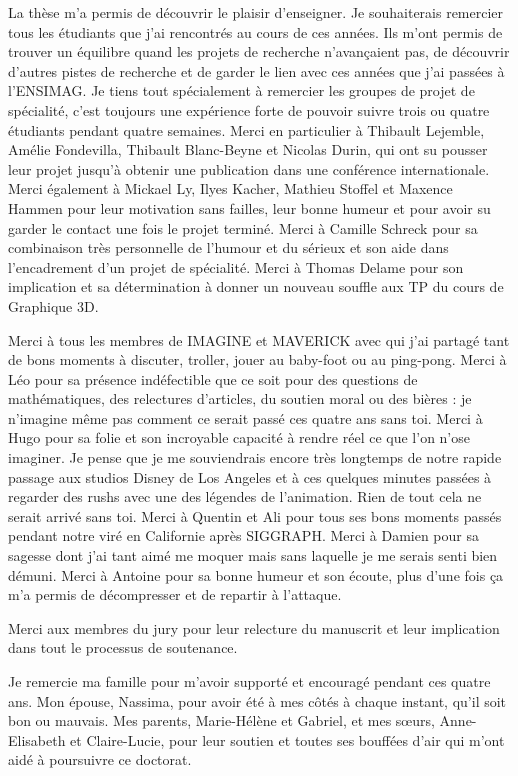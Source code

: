 La thèse m'a permis de découvrir le plaisir d'enseigner. Je souhaiterais remercier tous les étudiants que j'ai rencontrés au cours de ces années.
Ils m'ont permis de trouver un équilibre quand les projets de recherche n’avançaient pas, de découvrir d'autres pistes de recherche et de garder le lien avec ces années que j'ai passées à l'ENSIMAG. Je tiens tout spécialement à remercier les groupes de projet de spécialité, c'est toujours une expérience forte de pouvoir suivre trois ou quatre étudiants pendant quatre semaines. Merci en particulier à Thibault Lejemble, Amélie Fondevilla, Thibault Blanc-Beyne et Nicolas Durin, qui ont su pousser leur projet jusqu'à obtenir une publication dans une conférence internationale. Merci également à Mickael Ly, Ilyes Kacher, Mathieu Stoffel et Maxence Hammen pour leur motivation sans failles, leur bonne humeur et pour avoir su garder le contact une fois le projet terminé. Merci à Camille Schreck pour sa combinaison très personnelle de l'humour et du sérieux et son aide dans l'encadrement d'un projet de spécialité. Merci à Thomas Delame pour son implication et sa détermination à donner un nouveau souffle aux TP du cours de Graphique 3D.


Merci à tous les membres de IMAGINE et MAVERICK avec qui j'ai partagé tant de bons moments à discuter, troller, jouer au baby-foot ou au ping-pong.
Merci à Léo pour sa présence indéfectible que ce soit pour des questions de mathématiques, des relectures d'articles, du soutien moral ou des bières : je n'imagine même pas comment ce serait passé ces quatre ans sans toi.
Merci à Hugo pour sa folie et son incroyable capacité à rendre réel ce que l'on n'ose imaginer. Je pense que je me souviendrais encore très longtemps de notre rapide passage aux studios Disney de Los Angeles et à ces quelques minutes passées à regarder des rushs avec une des légendes de l'animation. Rien de tout cela ne serait arrivé sans toi.
Merci à Quentin et Ali pour tous ses bons moments passés pendant notre viré en Californie après SIGGRAPH.
Merci à Damien pour sa sagesse dont j'ai tant aimé me moquer mais sans laquelle je me serais senti bien démuni.
Merci à Antoine pour sa bonne humeur et son écoute, plus d'une fois ça m'a permis de décompresser et de repartir à l'attaque.

Merci aux membres du jury pour leur relecture du manuscrit et leur implication dans tout le processus de soutenance.

Je remercie ma famille pour m'avoir supporté et encouragé pendant ces quatre ans.
Mon épouse, Nassima, pour avoir été à mes côtés à chaque instant, qu'il soit bon ou mauvais.
Mes parents, Marie-Hélène et Gabriel, et mes sœurs, Anne-Elisabeth et Claire-Lucie, pour leur soutien et toutes ses bouffées d'air qui m'ont aidé à poursuivre ce doctorat.
